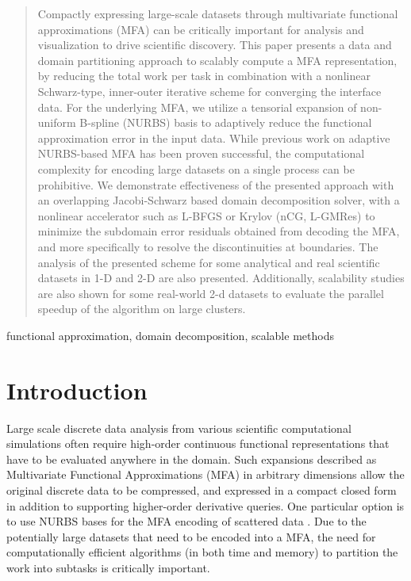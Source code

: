 \documentclass[conference]{IEEEtran}
\begin{document}
\begin{abstract}
Compactly expressing large-scale datasets through multivariate functional approximations (MFA) can be critically important for analysis and visualization to drive scientific discovery. This paper presents a data and domain partitioning approach to scalably compute a MFA representation, by reducing the total work per task in combination with a nonlinear Schwarz-type, inner-outer iterative scheme for converging the interface data. For the underlying MFA, we utilize a tensorial expansion of non-uniform B-spline (NURBS) basis to adaptively reduce the functional approximation error in the input data. While previous work on adaptive NURBS-based MFA has been proven successful, the computational complexity for encoding large datasets on a single process can be prohibitive. We demonstrate effectiveness of the presented approach with an overlapping Jacobi-Schwarz based domain decomposition solver, with a nonlinear accelerator such as L-BFGS or Krylov (nCG, L-GMRes) to minimize the subdomain error residuals obtained from decoding the MFA, and more specifically to resolve the discontinuities at boundaries. The analysis of the presented scheme for some analytical and real scientific datasets in 1-D and 2-D are also presented. Additionally, scalability studies are also shown for some real-world 2-d datasets to evaluate the parallel speedup of the algorithm on large clusters.
\end{abstract}

\begin{IEEEkeywords}
functional approximation, domain decomposition, scalable methods
\end{IEEEkeywords}

\section{Introduction}

Large scale discrete data analysis from various scientific computational simulations often require high-order continuous functional representations that have to be evaluated anywhere in the domain. Such expansions described as Multivariate Functional Approximations (MFA) in arbitrary dimensions \cite{nurbs-book} allow the original discrete data to be compressed, and expressed in a compact closed form in addition to supporting higher-order derivative queries. One particular option is to use NURBS bases for the MFA encoding of scattered data \cite{peterka-mfa}. Due to the potentially large datasets that need to be encoded into a MFA, the need for computationally efficient algorithms (in both time and memory) to partition the work into subtasks is critically important. 
\end{document}
